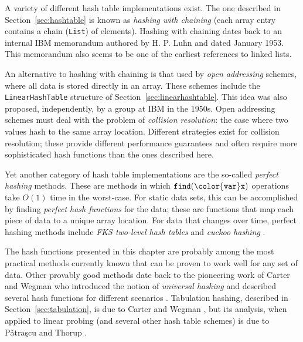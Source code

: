 \documentclass[10pt]{book}
\newcommand{\secref}[1]{Section~\ref{sec:#1}}
\theoremstyle{plain}
\theoremstyle{definition}
\begin{document}
A variety of different hash table implementations exist. The one
described in \secref{hashtable} is known as \emph{hashing with chaining}
%
(each array entry contains a chain (\texttt{List}) of elements).  Hashing with
chaining dates back to an internal IBM memorandum authored by H. P. Luhn
and dated January 1953. This memorandum also seems to be one of the
earliest references to linked lists.

%
An alternative to hashing with chaining is that used by \emph{open
addressing} schemes, where all data is stored directly in an
array.  These schemes include the \texttt{LinearHashTable} structure of
\secref{linearhashtable}. This idea was also proposed, independently, by
a group at IBM in the 1950s.  Open addressing schemes must deal with the
problem of \emph{collision resolution}: 
%
the case where two values hash
to the same array location.  Different strategies exist for collision
resolution; these provide different performance guarantees and often
require more sophisticated hash functions than the ones described here.

Yet another category of hash table implementations are the so-called
\emph{perfect hashing} methods.
%
These are methods in which \ensuremath{\mathtt{find({\color{var}x})}}
operations take $O(1)$ time in the worst-case.  For static data sets,
this can be accomplished by finding \emph{perfect hash functions}
%
%
for
the data; these are functions that map each piece of data to a unique
array location.  For data that changes over time, perfect hashing
methods include \emph{FKS two-level hash tables}
%
%
\cite{fks84,dkkmrt94}
and \emph{cuckoo hashing} \cite{pr04}.
%
%

The hash functions presented in this chapter are probably among the most
practical methods currently known that can be proven to work well for any
set of data.  Other provably good methods date back to the pioneering work
of Carter and Wegman who introduced the notion of \emph{universal hashing}
%
%
and described several hash functions for different scenarios \cite{cw79}.
Tabulation hashing, described in \secref{tabulation}, is due to Carter
and Wegman \cite{cw79}, but its analysis, when applied to linear probing
(and several other hash table schemes) is due to P\v{a}tra\c{s}cu and
Thorup \cite{pt12}.
\end{document}
